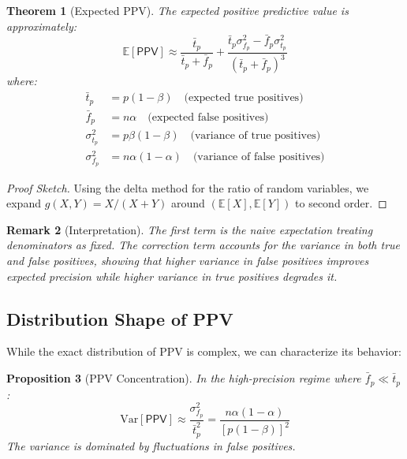 \documentclass[11pt,final,hidelinks]{article}
\newtheorem{theorem}{Theorem}[section]
\newtheorem{proposition}[theorem]{Proposition}
\newtheorem{remark}[theorem]{Remark}
\newcommand{\Expect}[1]{\mathbb{E}\left[#1\right]}
\newcommand{\Var}[1]{\mathrm{Var}\left[#1\right]}
\newcommand{\PPV}{\mathsf{PPV}}  %
\newcommand{\fprate}{\alpha}
\newcommand{\fnrate}{\beta}
\begin{document}
\begin{theorem}[Expected PPV]
\label{thm:expected-ppv}
The expected positive predictive value is approximately:
\begin{equation}
\Expect{\PPV} \approx \frac{\bar{t}_p}{\bar{t}_p + \bar{f}_p} + \frac{\bar{t}_p \sigma_{f_p}^2 - \bar{f}_p \sigma_{t_p}^2}{(\bar{t}_p + \bar{f}_p)^3}
\end{equation}
where:
\begin{align}
\bar{t}_p &= p(1-\fnrate) \quad \text{(expected true positives)} \\
\bar{f}_p &= n\fprate \quad \text{(expected false positives)} \\
\sigma_{t_p}^2 &= p\fnrate(1-\fnrate) \quad \text{(variance of true positives)} \\
\sigma_{f_p}^2 &= n\fprate(1-\fprate) \quad \text{(variance of false positives)}
\end{align}
\end{theorem}

\begin{proof}[Proof Sketch]
Using the delta method for the ratio of random variables, we expand $g(X,Y) = X/(X+Y)$ around $(\Expect{X}, \Expect{Y})$ to second order.
\end{proof}

\begin{remark}[Interpretation]
The first term is the naive expectation treating denominators as fixed. The correction term accounts for the variance in both true and false positives, showing that higher variance in false positives improves expected precision while higher variance in true positives degrades it.
\end{remark}

\subsection{Distribution Shape of PPV}

While the exact distribution of PPV is complex, we can characterize its behavior:

\begin{proposition}[PPV Concentration]
In the high-precision regime where $\bar{f}_p \ll \bar{t}_p$:
\begin{equation}
\Var{\PPV} \approx \frac{\sigma_{f_p}^2}{\bar{t}_p^2} = \frac{n\fprate(1-\fprate)}{[p(1-\fnrate)]^2}
\end{equation}
The variance is dominated by fluctuations in false positives.
\end{proposition}
\end{document}
